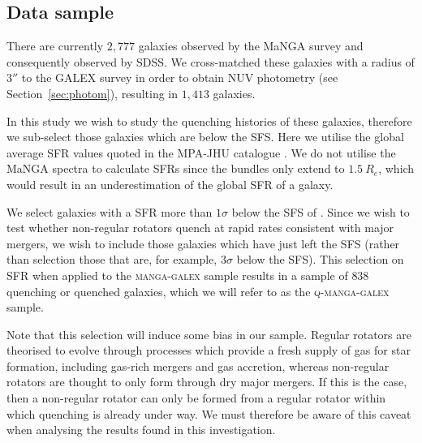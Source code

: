 \documentclass[useAMS,usenatbib]{mn2e}
\begin{document}
\subsection{Data sample}\label{sec:mangasample}

There are currently $2,777$ galaxies observed by the MaNGA survey and consequently observed by SDSS. We cross-matched these galaxies with a radius of $3''$ to the GALEX survey in order to obtain NUV photometry (see Section~\ref{sec:photom}), resulting in $1,413$ galaxies.

In this study we wish to study the quenching histories of these galaxies, therefore we sub-select those galaxies which are below the SFS. Here we utilise the global average SFR values quoted in the MPA-JHU catalogue \citep[][which are corrected for aperture bias]{kauffmann03, brinchmann04}. We do not utilise the MaNGA spectra to calculate SFRs since the bundles only extend to $1.5~R_e$, which would result in an underestimation of the global SFR of a galaxy. 

We select galaxies with a SFR more than $1\sigma$ below the SFS of \cite{peng10}. Since we wish to test whether non-regular rotators quench at rapid rates consistent with major mergers, we wish to include those galaxies which have just left the SFS (rather than selection those that are, for example, $3\sigma$ below the SFS).
This selection on SFR when applied to the \textsc{manga-galex} sample results in a sample of $838$ quenching or quenched galaxies, which we will refer to as the \textsc{q-manga-galex} sample. %

Note that this selection will induce some bias in our sample. Regular rotators are theorised to evolve through processes which provide a fresh supply of gas for star formation, including gas-rich mergers and gas accretion, whereas non-regular rotators are thought to only form through dry major mergers. If this is the case, then a non-regular rotator can only be formed from a regular rotator within which quenching is already under way. We must therefore be aware of this caveat when analysing the results found in this investigation.  
\end{document}
